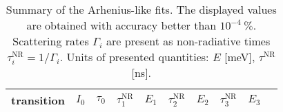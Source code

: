 \begin{table}
	\centering
	\caption{Summary of the Arhenius-like fits. The displayed values are obtained with accuracy better than $10^{-4}~\%$. Scattering rates $\Gamma_i$ are present as non-radiative times $\tau_i^\mathrm{NR}=1/\Gamma_i$. Units of presented quantities: $E$ [meV], $\tau^\mathrm{NR}$ [ns].}
	\begin{tabularx}{1\textwidth}{cCCCCCCCCC}%
		\toprule
		
		
		
		
		
			transition & $I_0$ & $\tau_0$ & $\tau_1^\mathrm{NR}$ & $E_1$ & $\tau_2^\mathrm{NR}$ & $E_2$ & $\tau_3^\mathrm{NR}$ & $E_3$\\ 	
			\midrule
			\midrule
			

\end{tabularx}
\end{table}
